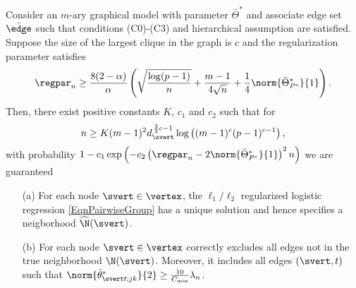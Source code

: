 \begin{theorem}
Consider an $m$-ary graphical model with parameter $\bar{\Theta}^*$ and associate edge set $\bar{\edge}$ such that conditions (C0)-(C3) and hierarchical assumption are satisfied. Suppose the size of the largest clique in the graph is $c$ and the regularization parameter satisfies
\begin{equation}
\regpar_n\geq \frac{8(2-\alpha)}{\alpha}\left(\sqrt{\frac{\log(p-1)}{n}}+\frac{m-1}{4\sqrt{n}} +\frac{1}{4}\norm{\bar{\Theta}^*_{P^c}}{1}\right).
\end{equation}
Then, there exist positive constants $K$, $c_1$ and $c_2$ such that for 
\begin{equation}
n\geq K (m-1)^2 d_\svert^{\,\frac{3}{2}c-1} \log\left((m-1)^c(p-1)^{c-1}\right),
\end{equation}
with probability $1-c_1\exp\left(-c_2\left(\regpar_n-2\norm{\bar{\Theta}^*_{P^c}}{1}\right)^2n\right)$ we are guaranteed
\begin{itemize}
\item [(a)] For each node $\svert\in\vertex$, the $\ell_1/\ell_2$ regularized logistic regression \eqref{EqnPairwiseGroup} has a unique solution and hence specifies a neigborhood $\widehat{\N}(\svert)$.
\item [(b)] For each node $\svert\in\vertex$ correctly excludes all edges not in the true neighborhood $\N(\svert)$. Moreover, it includes all edges $(\svert,t)$ such that $\norm{\bar{\theta}^*_{\svert t;jk}}{2}\geq\frac{10}{C_{\min}}\lambda_n$.\\
\end{itemize}
\end{theorem}

